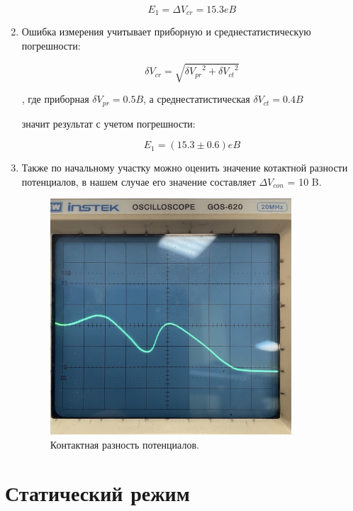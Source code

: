 \documentclass[a4paper,12pt]{article}
\begin{document}
\begin{enumerate}
\[E_1 =  \Delta{V_{cr}} = 15.3 eB\]

\item Ошибка измерения учитывает приборную и среднестатистическую погрешности:

\[ \delta{V_{cr}} = \sqrt{\delta{V_{pr}}^2 + \delta{V_{ct}}^2} \]

 , где приборная $\delta{V_{pr}} = 0.5B$, а среднестатистическая $\delta{V_{ct}} = 0.4B$
 
 значит результат с учетом погрешности:
 
 \[E_1 = (15.3 \pm 0.6) eB\]
 

\item Также по начальному участку можно оценить значение котактной разности потенциалов, в нашем случае его значение составляет $\Delta{V_{con}}$ = 10 B.

    \begin{figure}[H]
  \begin{center}
    \includegraphics[width=9cm]{ex4.jpg}
    \caption{Контактная разность потенциалов.}
    \label{fig:}
  \end{center}
\end{figure}


 \end{enumerate}


\section{Статический режим} 
  
\end{document}
